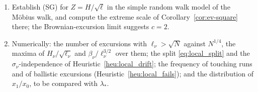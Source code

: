 \documentclass[11pt]{amsart}
\numberwithin{equation}{section}
\theoremstyle{plain}
\theoremstyle{definition}
\theoremstyle{remark}
\begin{document}
\begin{enumerate}[label=\textup{(\arabic*)}]
whether the bridge constraints \eqref{eq:Q_def}, \eqref{eq:zeroth-corr}
admit a third independent relation involving the defect
$\ell_\nu/2-H_\nu\ge0$.
\item Establish (SG) for $Z=H/\sqrt\ell$ in the simple random walk model of
the M\"obius walk, and compute the extreme scale of
Corollary~\ref{cor:ev-square} there; the Brownian-excursion limit suggests
$c=2$.
\item Numerically: the number of excursions with $\ell_\nu>\sqrt N$ against
$N^{1/4}$, the maxima of $H_\nu/\sqrt{\ell_\nu}$ and $\beta_\nu/\ell_\nu^{3/2}$
over them; the split \eqref{eq:local_split} and the $\sigma_\nu$-independence
of Heuristic~\ref{heu:local_drift}; the frequency of touching runs and of
ballistic excursions (Heuristic~\ref{heu:local_fails}); and the distribution
of $x_1/x_0$, to be compared with $\lambda_*$.
\end{enumerate}
\end{document}
